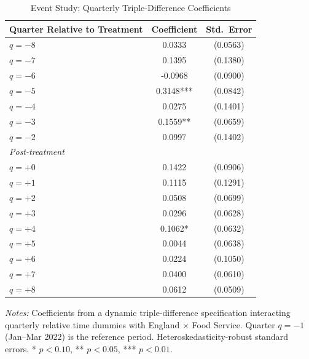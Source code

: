 \begin{table}[H]
\centering
\caption{Event Study: Quarterly Triple-Difference Coefficients}
\label{tab:eventstudy}
\begin{threeparttable}
\begin{tabular}{lcc}
\toprule
Quarter Relative to Treatment & Coefficient & Std.\ Error \\
\midrule
$q = -8$ & 0.0333 & (0.0563) \\
$q = -7$ & 0.1395 & (0.1380) \\
$q = -6$ & -0.0968 & (0.0900) \\
$q = -5$ & 0.3148*** & (0.0842) \\
$q = -4$ & 0.0275 & (0.1401) \\
$q = -3$ & 0.1559** & (0.0659) \\
$q = -2$ & 0.0997 & (0.1402) \\
\midrule
\multicolumn{3}{l}{\textit{Post-treatment}} \\
\midrule
$q = +0$ & 0.1422 & (0.0906) \\
$q = +1$ & 0.1115 & (0.1291) \\
$q = +2$ & 0.0508 & (0.0699) \\
$q = +3$ & 0.0296 & (0.0628) \\
$q = +4$ & 0.1062* & (0.0632) \\
$q = +5$ & 0.0044 & (0.0638) \\
$q = +6$ & 0.0224 & (0.1050) \\
$q = +7$ & 0.0400 & (0.0610) \\
$q = +8$ & 0.0612 & (0.0509) \\
\bottomrule
\end{tabular}
\begin{tablenotes}[flushleft]
\small
\item \textit{Notes:} Coefficients from a dynamic triple-difference specification interacting quarterly relative time dummies with England $\times$ Food Service. Quarter $q = -1$ (Jan--Mar 2022) is the reference period. Heteroskedasticity-robust standard errors. * $p<0.10$, ** $p<0.05$, *** $p<0.01$.
\end{tablenotes}
\end{threeparttable}
\end{table}
